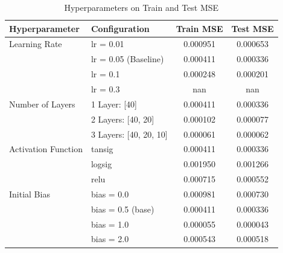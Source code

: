 \documentclass[11pt]{article}
\begin{document}
\begin{table}[h!]
\centering
\begin{tabular}{|l|l|c|c|}
\hline
\textbf{Hyperparameter} & \textbf{Configuration} & \textbf{Train MSE} & \textbf{Test MSE} \tabularnewline \hline
Learning Rate & lr = 0.01 & 0.000951 & 0.000653 \tabularnewline
              & lr = 0.05 (Baseline) & 0.000411 & 0.000336 \tabularnewline
              & lr = 0.1 & 0.000248 & 0.000201 \tabularnewline
              & lr = 0.3 & nan & nan \tabularnewline \hline
Number of Layers & 1 Layer: [40]  & 0.000411 & 0.000336 \tabularnewline
                 & 2 Layers: [40, 20] & 0.000102 & 0.000077 \tabularnewline
                 & 3 Layers: [40, 20, 10] & 0.000061 & 0.000062 \tabularnewline \hline
Activation Function & tansig & 0.000411 & 0.000336 \tabularnewline
                    & logsig & 0.001950 & 0.001266 \tabularnewline
                    & relu & 0.000715 & 0.000552 \tabularnewline \hline
Initial Bias & bias = 0.0 & 0.000981 & 0.000730 \tabularnewline
             & bias = 0.5 (base) & 0.000411 & 0.000336 \tabularnewline
             & bias = 1.0 & 0.000055 & 0.000043 \tabularnewline
             & bias = 2.0 & 0.000543 & 0.000518 \tabularnewline \hline
\end{tabular}
\caption{Hyperparameters on Train and Test MSE}
\end{table}
\end{document}
